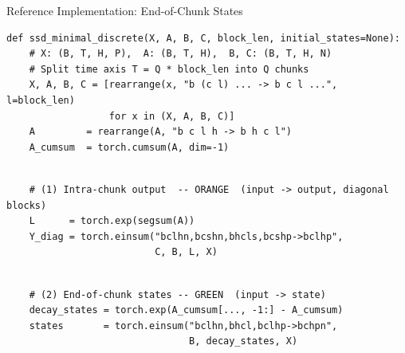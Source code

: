 \begin{frame}[fragile]{Reference Implementation: End-of-Chunk States}

\begin{lstlisting}[aboveskip=0pt,belowskip=0pt,frame=none,backgroundcolor=\color{mambagray!10}]
def ssd_minimal_discrete(X, A, B, C, block_len, initial_states=None):
    # X: (B, T, H, P),  A: (B, T, H),  B, C: (B, T, H, N)
    # Split time axis T = Q * block_len into Q chunks
    X, A, B, C = [rearrange(x, "b (c l) ... -> b c l ...", l=block_len)
                  for x in (X, A, B, C)]
    A         = rearrange(A, "b c l h -> b h c l")
    A_cumsum  = torch.cumsum(A, dim=-1)
\end{lstlisting}
\begin{lstlisting}[aboveskip=0pt,belowskip=0pt,frame=none,backgroundcolor=\color{orange!15}]

    # (1) Intra-chunk output  -- ORANGE  (input -> output, diagonal blocks)
    L      = torch.exp(segsum(A))
    Y_diag = torch.einsum("bclhn,bcshn,bhcls,bcshp->bclhp",
                          C, B, L, X)
\end{lstlisting}
\begin{lstlisting}[aboveskip=0pt,belowskip=0pt,frame=none,backgroundcolor=\color{mambagreen!18}]

    # (2) End-of-chunk states -- GREEN  (input -> state)
    decay_states = torch.exp(A_cumsum[..., -1:] - A_cumsum)
    states       = torch.einsum("bclhn,bhcl,bclhp->bchpn",
                                B, decay_states, X)
\end{lstlisting}


\end{frame}
